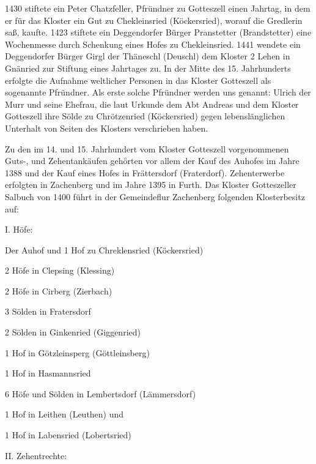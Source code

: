 \documentclass[12pt,a4pager,draft]{book}
\begin{document}
1430 stiftete ein Peter Chatzfeller, Pfründner zu Gotteszell einen Jahrtag, in
dem er für das Kloster ein Gut zu Chekleinsried (Köckersried), worauf die
Gredlerin saß, kaufte. 1423 stiftete ein Deggendorfer Bürger Pranstetter
(Brandstetter) eine Wochenmesse durch Schenkung eines Hofes zu Chekleinsried.
1441 wendete ein Deggendorfer Bürger Girgl der Thäneschl (Deuschl) dem Kloster 2
Lehen in Gnänried zur Stiftung eines Jahrtages zu. In der Mitte des 15.
Jahrhunderts erfolgte die Aufnahme weltlicher Personen in das Kloster Gotteszell
als sogenannte Pfründner. Als erste solche Pfründner werden uns genannt: Ulrich
der Murr und seine Ehefrau, die laut Urkunde dem Abt Andreas und dem Kloster
Gotteszell ihre Sölde zu Chrötzenried (Köckersried) gegen lebenslänglichen
Unterhalt von Seiten des Klosters verschrieben haben.

Zu den im 14. und 15. Jahrhundert vom Kloster Gotteszell vorgenommenen Guts-,
und Zehentankäufen gehörten vor allem der Kauf des Auhofes im Jahre 1388 und der
Kauf eines Hofes in Frättersdorf (Fraterdorf). Zehenterwerbe erfolgten in
Zachenberg und im Jahre 1395 in Furth. Das Kloster Gotteszeller Salbuch von 1400
führt in der Gemeindeflur Zachenberg folgenden Klosterbesitz auf:

I. Höfe:

\begin{compactitem}
\item Der Auhof und 1 Hof zu Chreklensried (Köckersried)
\item 2 Höfe in Clepsing (Klessing)
\item 2 Höfe in Cirberg (Zierbach)
\item 3 Sölden in Fratersdorf
\item 2 Sölden in Ginkenried (Giggenried)
\item 1 Hof in Götzleinsperg (Göttleinsberg)
\item 1 Hof in Hasmannsried
\item 6 Höfe und Sölden in Lembertsdorf (Lämmersdorf)
\item 1 Hof in Leithen (Leuthen) und
\item 1 Hof in Labensried (Lobertsried)
\end{compactitem}

II. Zehentrechte:
\end{document}
